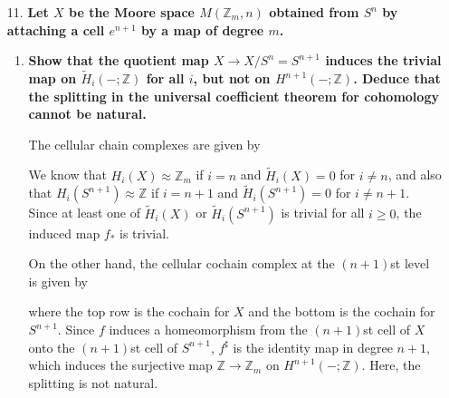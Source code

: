 \documentclass[12pt]{article}
\newcommand{\iso}{\approx}
\begin{document}
\begin{enumerate}
    \item[11.]
        \boldmath\textbf{Let $X$ be the Moore space $M(\mathbb{Z}_m, n)$ obtained from $S^n$ by attaching a cell $e^{n + 1}$ by a map of degree $m$.
        }\unboldmath
        \begin{enumerate}
            \item
                \boldmath\textbf{Show that the quotient map $X \to X/S^n = S^{n + 1}$ induces the trivial map on $\tilde{H}_i(-; \mathbb{Z})$ for all $i$, but not on $H^{n + 1}(-; \mathbb{Z})$. Deduce that the splitting in the universal coefficient theorem for cohomology cannot be natural.
                }\unboldmath \par
                The cellular chain complexes are given by
                \begin{center}
                \end{center}
                We know that $H_i(X) \iso \mathbb{Z}_m$ if $i = n$ and $\tilde{H}_i(X) = 0$ for $i \neq n$, and also that $H_i(S^{n + 1}) \iso \mathbb{Z}$ if $i = n + 1$ and $\tilde{H}_i(S^{n + 1}) = 0$ for $i \neq n + 1$. Since at least one of $\tilde{H}_i(X)$ or $\tilde{H}_i(S^{n + 1})$ is trivial for all $i \geq 0$, the induced map $f_*$ is trivial. \par
                On the other hand, the cellular cochain complex at the $(n + 1)$st level is given by
                \begin{center}
                \end{center}
                where the top row is the cochain for $X$ and the bottom is the cochain for $S^{n + 1}$. Since $f$ induces a homeomorphism from the $(n + 1)$st cell of $X$ onto the $(n + 1)$st cell of $S^{n + 1}$, $f^\sharp$ is the identity map in degree $n + 1$, which induces the surjective map $\mathbb{Z} \to \mathbb{Z}_m$ on $H^{n + 1}(-; \mathbb{Z})$. Here, the splitting is not natural. \par

\end{enumerate}
\end{enumerate}
\end{document}
